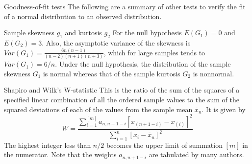 \documentclass[8pt]{beamer}
\renewcommand{\emph}[1]{\textcolor{myorange}{#1}}
\begin{document}
\begin{frame}{Goodness-of-fit tests}
    The following are a summary of other tests to verify the fit of a \emph{normal distribution} to an observed distribution. 
    \begin{block}{Sample skewness $g_1$ and kurtosis $g_2$}
        For the \emph{null hypothesis} $E(G_1) = 0$ and $E(G_2) = 3$. Also, the \emph{asymptotic variance} of the \emph{skewness} is $Var(G_1) = \frac{6n(n-1)}{(n-2)(n+1)(n+3)}$, which for large samples tends to $Var(G_1) =6/n$. Under the null hypothesis, the distribution of the \emph{sample skewness} $G_1$ is normal whereas that of the \emph{sample kurtosis} $G_2$ is nonnormal.

    \end{block}

    \begin{block}{Shapiro and Wilk's W-statistic}
        This is the ratio of the sum of the squares of a specified linear combination of all the ordered sample values to the sum of the squared deviations of each of the values from the sample mean $\bar{x}_n$. It is given by
        \[
        W = \frac{\sum_{i=1}^{[m]} a_{n, n+1-i} \left[ x_{(n+1-i)} - x_{(i)} \right]^2}{\sum_{i=1}^n [x_i - \bar{x}_n ]^2}  
        \]
The highest integer less than $n/2$ becomes the upper limit of summation $[m]$ in the numerator. Note that the weights $a_{n, n+1-i}$ are tabulated by many authors. 
    \end{block}
   \end{frame}

\end{document}
